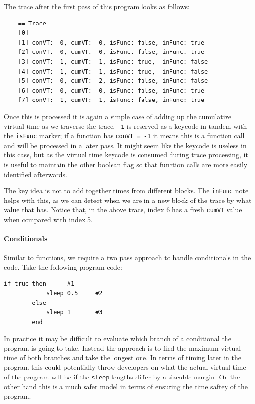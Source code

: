 \documentclass[11pt, abstracton, twoside, titlepage=true]{scrartcl}
\begin{document}
The trace after the first pass of this program looks as follows:
\\
\begin{lstlisting}
    == Trace
    [0] -
    [1] conVT:  0, cumVT:  0, isFunc: false, inFunc: true
    [2] conVT:  0, cumVT:  0, isFunc: false, inFunc: true
    [3] conVT: -1, cumVT: -1, isFunc: true,  inFunc: false
    [4] conVT: -1, cumVT: -1, isFunc: true,  inFunc: false
    [5] conVT:  0, cumVT: -2, isFunc: false, inFunc: false
    [6] conVT:  0, cumVT:  0, isFunc: false, inFunc: true
    [7] conVT:  1, cumVT:  1, isFunc: false, inFunc: true
\end{lstlisting}

Once this is processed it is again a simple case of adding up the cumulative virtual
time as we traverse the trace. \texttt{-1} is reserved as a keycode in tandem with
the \texttt{isFunc} marker; if a function has \texttt{conVT = -1} it means this
is a function call and will be processed in a later pass. It might seem like the 
keycode is useless in this case, but as the virtual time keycode is consumed during 
trace processing, it is useful to maintain the other boolean flag so that function 
calls are more easily identified afterwards.

The key idea is not to add together times from different blocks. The 
\texttt{inFunc} note helps with this, as we can detect when we are in a new block 
of the trace by what value that has. Notice that, in the above trace, index 6 
has a fresh \texttt{cumVT} value when compared with index 5.

\paragraph{Conditionals}
Similar to functions, we require a two pass approach to handle conditionals in the 
code. Take the following program code:

\begin{minipage}{\textwidth}
	\begin{lstlisting}[style = sonicpi]
        if true then      #1
            sleep 0.5     #2
        else
            sleep 1       #3
        end
	\end{lstlisting}
	 \label{conditional}
\end{minipage}

In practice it may be difficult to evaluate which branch of a conditional the
program is going to take. Instead the approach is to find the maximum virtual time 
of both branches and take the longest one. In terms of timing later in the program 
this could potentially throw developers on what the actual virtual time of the 
program will be if the \texttt{sleep} lengths differ by a sizeable margin. On the 
other hand this is a much safer model in terms of ensuring the time saftey of the 
program.
\end{document}
